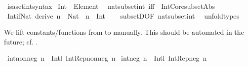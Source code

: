 \begin{isabellebody}
\isanewline
\isanewline
{}\isamarkupfalse%
\ isa{\isacharunderscore}{\kern0pt}set{\isacharunderscore}{\kern0pt}int{\isacharunderscore}{\kern0pt}syntax\isanewline
\isanewline
{}\isamarkupfalse%
\ {\isachardoublequoteopen}Int\ {\isasymequiv}\ Element\ {\isasymint}{\isachardoublequoteclose}\isanewline
\isanewline
{}\isamarkupfalse%
\ nat{\isacharunderscore}{\kern0pt}subset{\isacharunderscore}{\kern0pt}int\ {\isacharbrackleft}{\kern0pt}iff{\isacharbrackright}{\kern0pt}\ {\isacharequal}{\kern0pt}\ Int{\isachardot}{\kern0pt}Core{\isacharunderscore}{\kern0pt}subset{\isacharunderscore}{\kern0pt}Abs\isanewline
\isanewline
{}\isamarkupfalse%
\ Int{\isacharunderscore}{\kern0pt}if{\isacharunderscore}{\kern0pt}Nat\ {\isacharbrackleft}{\kern0pt}derive{\isacharbrackright}{\kern0pt}{\isacharcolon}{\kern0pt}\ {\isachardoublequoteopen}n\ {\isacharcolon}{\kern0pt}\ Nat\ {\isasymLongrightarrow}\ n\ {\isacharcolon}{\kern0pt}\ Int{\isachardoublequoteclose}\isanewline
%
\isadelimproof
\ \ %
\endisadelimproof
%
\isatagproof
{}\isamarkupfalse%
\ subsetD{\isacharbrackleft}{\kern0pt}OF\ nat{\isacharunderscore}{\kern0pt}subset{\isacharunderscore}{\kern0pt}int{\isacharbrackright}{\kern0pt}\ \isamarkupfalse%
\ unfold{\isacharunderscore}{\kern0pt}types%
\endisatagproof
{\isafoldproof}%
%
\isadelimproof
%
\endisadelimproof
%
\isadelimdocument
%
\endisadelimdocument
%
\isatagdocument
%
\isamarkuptrue%
%
\endisatagdocument
{\isafolddocument}%
%
\isadelimdocument
%
\endisadelimdocument
%
\begin{isamarkuptext}%
We lift constants/functions from  to \isa{{\isasymint}}
manually. This should be automated in the future; cf. .%
\end{isamarkuptext}\isamarkuptrue%
\isamarkupfalse%
\ {\isachardoublequoteopen}int{\isacharunderscore}{\kern0pt}nonneg\ n\ {\isasymequiv}\ Int{\isachardot}{\kern0pt}l\ {\isacharparenleft}{\kern0pt}Int{\isacharunderscore}{\kern0pt}Rep{\isacharunderscore}{\kern0pt}nonneg\ n{\isacharparenright}{\kern0pt}{\isachardoublequoteclose}\isanewline
{}\isamarkupfalse%
\ {\isachardoublequoteopen}int{\isacharunderscore}{\kern0pt}neg\ n\ {\isasymequiv}\ Int{\isachardot}{\kern0pt}l\ {\isacharparenleft}{\kern0pt}Int{\isacharunderscore}{\kern0pt}Rep{\isacharunderscore}{\kern0pt}neg\ n{\isacharparenright}{\kern0pt}{\isachardoublequoteclose}\isanewline

\end{isabellebody}
